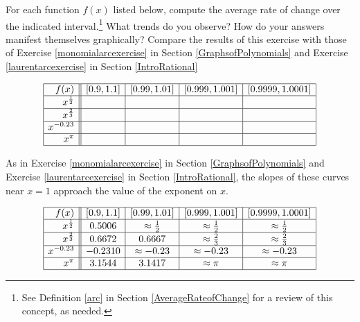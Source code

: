 \documentclass{ximera}
\begin{document}
\begin{problem}
For each function $f(x)$ listed below, compute the average rate of change over the indicated interval.\footnote{See Definition \ref{arc} in Section \ref{AverageRateofChange} for a review of this concept, as needed.}  What trends do you observe?  How do your answers manifest themselves graphically?  Compare the results of this exercise with those of Exercise \ref{monomialarcexercise} in Section \ref{GraphsofPolynomials} and Exercise \ref{laurentarcexercise} in Section \ref{IntroRational}

\[ \begin{array}{|r||c|c|c|c|}  \hline

 f(x) &  [0.9, 1.1] & [0.99, 1.01] &[0.999, 1.001] & [0.9999, 1.0001]  \\ \hline
 x^{\frac{1}{2}} &&&&  \\  \hline
 x^{\frac{2}{3}} &&&&  \\ \hline
 x^{-0.23} &&&&   \\  \hline
 x^{\pi}  &&&&   \\  \hline

\end{array} \]

\begin{solution}
As in  Exercise \ref{monomialarcexercise} in Section \ref{GraphsofPolynomials} and Exercise \ref{laurentarcexercise} in Section \ref{IntroRational}, the slopes of these curves near $x = 1$ approach the value of the exponent on $x$.

\[ \begin{array}{|r||c|c|c|c|}  \hline
 f(x) &  [0.9, 1.1] & [0.99, 1.01] &[0.999, 1.001] & [0.9999, 1.0001]  \\ \hline
 x^{\frac{1}{2}} & 0.5006 & \approx \frac{1}{2} & \approx \frac{1}{2} & \approx \frac{1}{2} \\  \hline
 x^{\frac{2}{3}} & 0.6672 & 0.6667 & \approx \frac{2}{3} & \approx \frac{2}{3}  \\ \hline
 x^{-0.23} & -0.2310 & \approx -0.23 &\approx -0.23 &  \approx -0.23  \\  \hline
 x^{\pi}  &3.1544 & 3.1417 & \approx \pi & \approx \pi   \\ \hline
\end{array} \]

\end{solution}

\end{problem}
\end{document}
